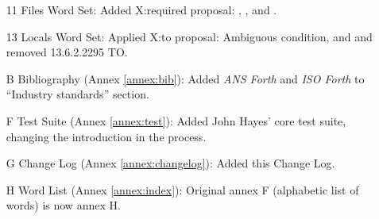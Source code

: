 \begin{itemize}
	\item[11] Files Word Set:
		Added \textsf{X:required} proposal:
		,
		,
		 and
		.

	\item[13] Locals Word Set:
		Applied \textsf{X:to} proposal:
		Ambiguous condition,
		 and 
		and removed 13.6.2.2295 TO.

	\item[B] Bibliography (Annex \ref{annex:bib}):
		Added \emph{ANS Forth} and \emph{ISO Forth} to
		``Industry standards'' section.

	\item[F] Test Suite (Annex \ref{annex:test}):
		Added John Hayes' core test suite, changing the
		introduction in the process.

	\item[G] Change Log (Annex \ref{annex:changelog}):
		Added this Change Log.

	\item[H] Word List (Annex \ref{annex:index}):
		Original annex F (alphabetic list of words) is now
		annex H.
	\end{itemize}


